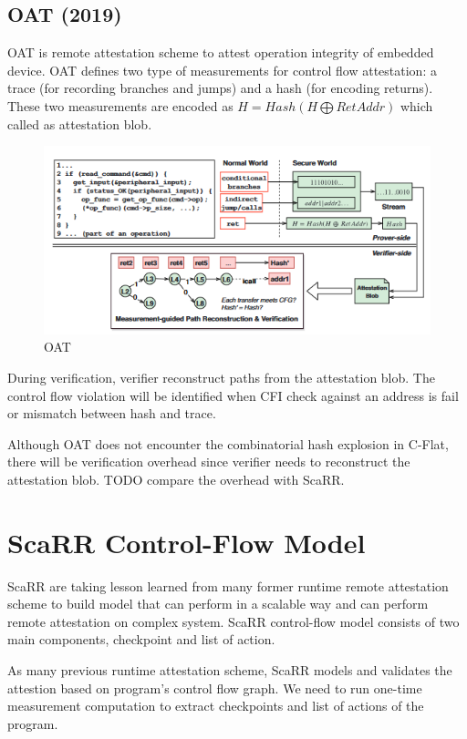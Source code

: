 \subsection{OAT (2019)}

OAT \cite{sunOATAttestingOperation2020} is remote attestation scheme to attest operation integrity of embedded device. OAT defines two type of measurements for control flow attestation: a trace (for recording branches and jumps) and a hash (for encoding returns). These two measurements are encoded as $H = Hash(H \bigoplus RetAddr)$ which called as attestation blob.

\begin{figure}[htbp]
\centerline{\includegraphics[scale=.5]{Figures/oat.png}}
\caption{OAT}
\label{fig:4-4}
\end{figure}

During verification, verifier reconstruct paths from the attestation blob. The control flow violation will be identified when CFI check against an address is fail or mismatch between hash and trace.

Although OAT does not encounter the combinatorial hash explosion in C-Flat, there will be verification overhead since verifier needs to reconstruct the attestation blob. TODO compare the overhead with ScaRR.

\section{ScaRR Control-Flow Model}

ScaRR \cite{toffaliniScaRRScalableRuntime2019} are taking lesson learned from many former runtime remote attestation scheme to build model that can perform in a scalable way and can perform remote attestation on complex system. ScaRR control-flow model consists of two main components, checkpoint and list of action. 

As many previous runtime attestation scheme, ScaRR models and validates the attestion based on program's control flow graph. We need to run one-time measurement computation to extract checkpoints and list of actions of the program.

